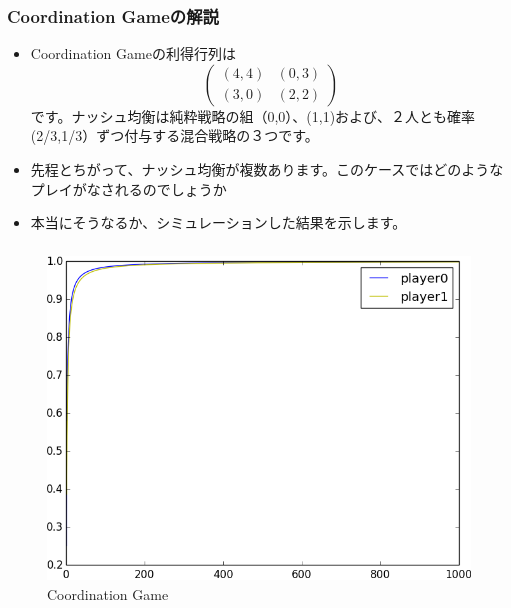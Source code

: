 \documentclass[dvipdfmx,fleqn]{beamer}
\begin{document}
\begin{frame}
\frametitle{Coordination Gameの解説}
\begin{itemize}\setlength{\parskip}{0.5em}
\item
Coordination Gameの利得行列は
\[\left( \begin{array}{cc}
(4,4) & (0,3) \\
(3,0) & (2,2) 
\end{array} \right)\]
です。ナッシュ均衡は純粋戦略の組（0,0）、(1,1)および、２人とも確率(2/3,1/3）ずつ付与する混合戦略の３つです。\pause

\item
先程とちがって、ナッシュ均衡が複数あります。このケースではどのようなプレイがなされるのでしょうか\pause
\item
本当にそうなるか、シミュレーションした結果を示します。



\end{itemize}
\end{frame}

\begin{frame}
\frametitle{}
\begin{figure}
 \centering
 \includegraphics[scale=0.58, bb=-250 -200 250 200]{coordinationgame_graph1.png.png}
 \caption{Coordination Game}
 \label{fig:coordination_plot1}
\end{figure}
\end{frame}
\end{document}

